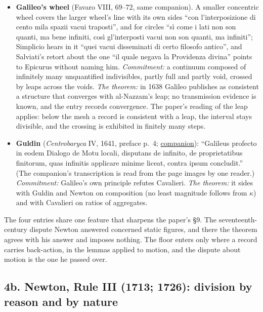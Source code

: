 \documentclass[11pt,a4paper]{article}
\begin{document}
\begin{itemize}
  composition. \emph{The theorem:} the cut measure keeps exactly this
  stance, a statement about aggregates of cuts (shares summing to
  \(K_\tau\) for every schedule); it composes no continuum, and the mark
  mesh bounds exhibition while leaving division free.
\item
  \textbf{Galileo's wheel} (Favaro VIII, 69--72, same companion). A
  smaller concentric wheel covers the larger wheel's line with its own
  sides ``con l'interposizione di cento mila spazii vacui traposti'',
  and for circles ``sì come i lati non son quanti, ma bene infiniti,
  così gl'interposti vacui non son quanti, ma infiniti''; Simplicio
  hears in it ``quei vacui disseminati di certo filosofo antico'', and
  Salviati's retort about the one ``il quale negava la Providenza
  divina'' points to Epicurus without naming him. \emph{Commitment:} a
  continuum composed of infinitely many unquantified indivisibles,
  partly full and partly void, crossed by leaps across the voids.
  \emph{The theorem:} in 1638 Galileo publishes as consistent a
  structure that converges with al-Nazzam's leap; no transmission
  evidence is known, and the entry records convergence. The paper's
  reading of the leap applies: below the mesh a record is consistent
  with a leap, the interval stays divisible, and the crossing is
  exhibited in finitely many steps.
\item
  \textbf{Guldin} (\emph{Centrobaryca} IV, 1641, preface p.~4;
  \href{../docs/classics/Guldin_Centrobaryca_LiberIV_1641_pages.md}{companion}):
  ``Galileus profecto in eodem Dialogo de Motu locali, disputans de
  infinito, de proprietatibus finitorum, quas infinitis applicare minime
  liceat, contra ipsum concludit.'' (The companion's transcription is
  read from the page images by one reader.) \emph{Commitment:} Galileo's
  own principle refutes Cavalieri. \emph{The theorem:} it sides with
  Guldin and Newton on composition (no least magnitude follows from
  \(\kappa\)) and with Cavalieri on ratios of aggregates.
\end{itemize}

The four entries share one feature that sharpens the paper's §9. The
seventeenth-century dispute Newton answered concerned static figures,
and there the theorem agrees with his answer and imposes nothing. The
floor enters only where a record carries back-action, in the lemmas
applied to motion, and the dispute about motion is the one he passed
over.

\hypertarget{b.-newton-rule-iii-1713-1726-division-by-reason-and-by-nature}{%
\subsection{4b. Newton, Rule III (1713; 1726): division by reason and by
nature}\label{b.-newton-rule-iii-1713-1726-division-by-reason-and-by-nature}}
\end{document}
